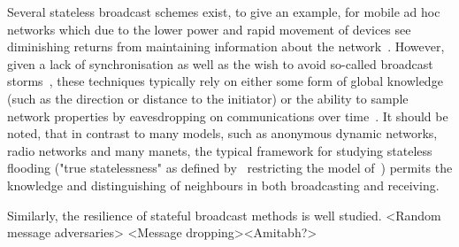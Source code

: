 Several stateless broadcast schemes exist, to give an example, for mobile ad hoc networks which due to the lower power and rapid movement of devices see diminishing returns from maintaining information about the network~\cite{manfredi2011understanding}. 
However, given a lack of synchronisation as well as the wish to avoid so-called broadcast storms~\cite{ni1999broadcast}, these techniques typically rely on either some form of global knowledge (such as the direction or distance to the initiator) or the ability to sample network properties by eavesdropping on communications over time~\cite{manetsArentReallyStateless,ruiz2015survey}.
It should be noted, that in contrast to many models, such as anonymous dynamic networks, radio networks and many manets, the typical framework for studying stateless flooding ("true statelessness" as defined by~\cite{turau2020stateless} restricting the model of~\cite{dolev2017stateless}) permits the knowledge and distinguishing of neighbours in both broadcasting and receiving.


Similarly, the resilience of stateful broadcast methods is well studied.
<Random message adversaries> <Message dropping><Amitabh?>